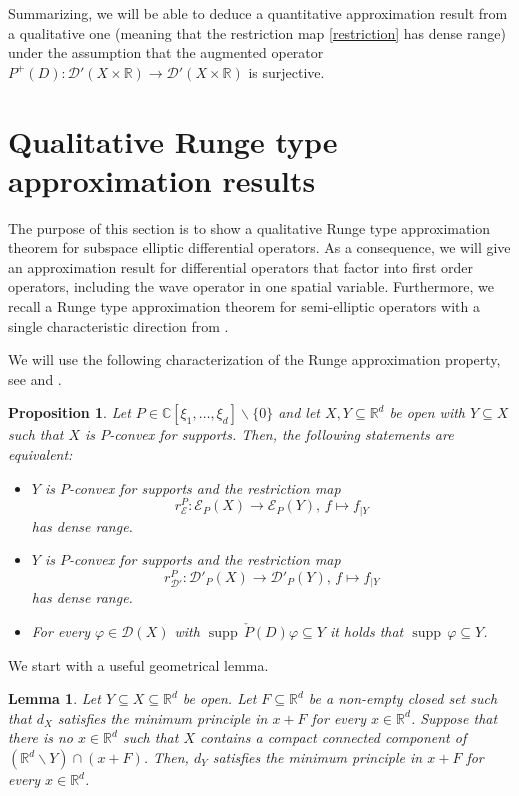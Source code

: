 \documentclass[12pt]{amsart}
\newcommand{\R}{\mathbb{R}}
\newcommand{\C}{\mathbb{C}}
\newcommand{\supp}{\operatorname{supp}\,}
\newtheorem{proposition}[theorem]{Proposition}
\newtheorem{lemma}[theorem]{Lemma}
\theoremstyle{definition}
\theoremstyle{remark}
\numberwithin{equation}{section}
\begin{document}
Summarizing, we will be able to deduce a quantitative approximation result from a qualitative  one (meaning that the restriction map \ref{restriction} has dense range) under the assumption  that the augmented operator $P^+(D): \mathscr{D}'(X\times\R) \to \mathscr{D}'(X\times\R)$ is surjective. 

\section{Qualitative Runge type approximation results}\label{sec: qualitative Runge}

The purpose of this section is to show a qualitative Runge type approximation theorem  for subspace elliptic differential operators.  As a consequence, we will give an approximation result for differential operators that factor into first order operators, including the  wave operator in one spatial variable. Furthermore, we recall a  Runge type approximation theorem for semi-elliptic operators with a single characteristic direction from \cite{Kalmes21}.

We will use the following characterization of the Runge approximation property, see \cite[Theorem 6]{Kalmes21} and \cite[Theorem 26.1]{Treves1967-2}.

\begin{proposition}\label{abstract-Runge}
	Let $P\in\C[\xi_1,\ldots,\xi_d] \backslash \{0\}$ and let $X,Y \subseteq\R^d$ be open with $Y \subseteq X$ such that $X$ is $P$-convex for supports. Then, the following statements are equivalent:
		\begin{itemize}
			\item[(i)] $Y$ is $P$-convex for supports and the restriction map $$
			r_{\mathscr{E}}^P:\mathscr{E}_P(X)\rightarrow\mathscr{E}_P(Y), \, f \mapsto f_{\mid Y}
			$$ has dense range.
		\item[(ii)] $Y$ is $P$-convex for supports and the restriction map $$
		r_{\mathscr{D}'}^P:\mathscr{D}'_P(X)\rightarrow\mathscr{D}'_P(Y), \, f \mapsto f_{\mid Y}
		$$ has dense range.
		\item[(iii)] For every $\varphi\in\mathscr{D}(X)$ with $\supp\check{P}(D)\varphi\subseteq Y$ it holds that $\supp\varphi\subseteq Y$.
	\end{itemize}
\end{proposition}

We start with a  useful geometrical lemma.

\begin{lemma}\label{lem: entailing minimum principle}
	Let $Y \subseteq X\subseteq\R^d$ be open. Let $F\subseteq\R^d$ be  a non-empty closed set such that $d_X$ satisfies the minimum principle in $x+F$ for every $x\in\R^d$. Suppose that there is no $x\in\R^d$ such that $X$ contains a compact connected component of $(\R^d\backslash Y)\cap (x+F)$. Then, $d_Y$ satisfies the minimum principle in $x+F$ for every $x\in\R^d$.
\end{lemma}
\end{document}
